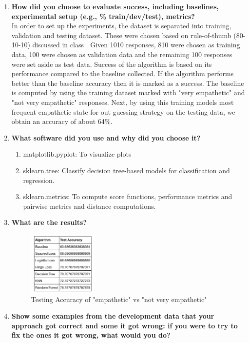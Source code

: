 \documentclass[5px]{report}
\begin{document}
\begin{enumerate}
\item \textbf{How did you choose to evaluate success, including baselines, experimental setup (e.g., \% train/dev/test), metrics?}\\
In order to set up the experiments, the dataset is separated into training, validation and testing dataset. These were chosen based on rule-of-thumb (80-10-10) discussed in class . Given 1010 responses, 810 were chosen as training data, 100 were chosen as validation data and the remaining 100 responses were set aside as test data. Success of the algorithm is based on its performance compared to the baseline collected. If the algorithm performs better than the baseline accuracy then it is marked as a success. 
The baseline is computed by using the training dataset marked with "very empathetic" and "not very empathetic" responses. Next, by using this training models most frequent empathetic state for out guessing strategy on the testing data, we obtain an accuracy of about 64\%.

\item \textbf{What software did you use and why did you choose it?}
  \begin{enumerate}
     \item matplotlib.pyplot: To visualize plots 
     \item sklearn.tree: Classify decision tree-based models for classification and regression.
     \item sklearn.metrics: To compute score functions, performance metrics and pairwise metrics and distance computations.
 \end{enumerate}

\item \textbf{What are the results?}
\begin{figure}[h]
  \centering
  \includegraphics[height=1.25in]{results.png}
  \caption{Testing Accuracy of "empathetic" vs "not very empathetic"}
  \label{f:myplotfig}
\end{figure}

\item \textbf{Show some examples from the development data that your approach got correct and some it got wrong: if you were to try to fix the ones it got wrong, what would you do?}

\end{enumerate}
\end{document}
